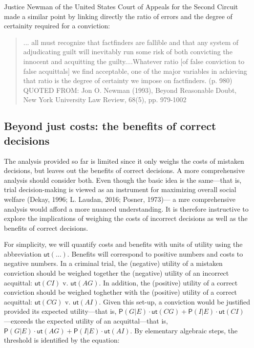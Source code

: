 \documentclass[
  10pt,
  dvipsnames,enabledeprecatedfontcommands]{scrartcl}
\newcommand{\pr}[1]{\mathsf{P}(#1)}
\newcommand{\ut}{\mathsf{ut}}
\begin{document}
\noindent Justice Newman of the United States Court of Appeals for the
Second Circuit made a similar point by linking directly the ratio of
errors and the degree of certainity required for a conviction:

\begin{quote}
... all must recognize that factfinders are
fallible and that any system of adjudicating guilt will inevitably run some
risk of both convicting the innocent and acquitting the guilty....Whatever ratio [of false conviction to false acquittals] we find acceptable, one of the major variables in achieving that ratio is the degree of certainty we impose on factfinders. (p. 980)
QUOTED FROM: Jon O. Newman (1993), Beyond Reasonable Doubt, New York University Law Review, 68(5), pp. 979-1002
\end{quote}

\hypertarget{beyond-just-costs-the-benefits-of-correct-decisions}{%
\subsection{Beyond just costs: the benefits of correct
decisions}\label{beyond-just-costs-the-benefits-of-correct-decisions}}

The analysis provided so far is limited since it only weighs the costs
of mistaken decisions, but leaves out the benefits of correct decisions.
A more comprehensive analysis should consider both. Even though the
basic idea is the same---that is, trial decision-making is viewed as an
instrument for maximizing overall social welfare (Dekay, 1996; L.
Laudan, 2016; Posner, 1973)--- a mre comprehensive analysis would afford
a more nuanced understanding. It is therefore instructive to explore the
implications of weighing the costs of incorrect decisions as well as the
benefits of correct decisions.

For simplicity, we will quantify costs and benefits with units of
utility using the abbreviation \(\ut(...)\). Benefits will correspond to
positive numbers and costs to negative numbers. In a criminal trial, the
(negative) utility of a mistaken conviction should be weighed together
the (negative) utility of an incorrect acquittal: \(\ut(CI)\) v.
\(\ut(AG)\). In addition, the (positive) utility of a correct conviction
should be weighed toghether with the (positive) utility of a correct
acquittal: \(\ut(CG)\) v. \(\ut(AI)\). Given this set-up, a conviction
would be justified provided its expected utility---that is,
\(\pr{G | E} \cdot \ut(CG) + \pr{I | E } \cdot \ut(CI)\)---exceeds the
expected utility of an acquittal---that is,
\(\pr{G | E} \cdot \ut(AG) + \pr{I | E} \cdot \ut(AI)\). By elementary
algebraic steps, the threshold is identified by the equation:
\end{document}
